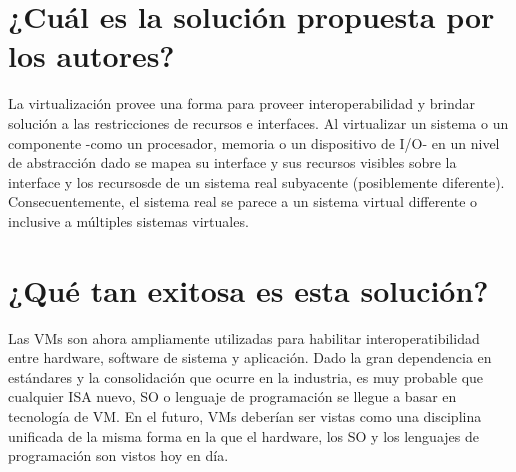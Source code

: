 \section{¿Cuál es la solución propuesta por los autores?}
La virtualización provee una forma para proveer interoperabilidad y brindar solución a las restricciones de recursos e interfaces. Al virtualizar un sistema o un componente -como un procesador, memoria o un dispositivo de I/O- en un nivel de abstracción dado se mapea su interface y sus recursos visibles sobre la interface y los recursosde de un sistema real subyacente (posiblemente diferente).  Consecuentemente, el sistema real se parece a un sistema virtual differente o inclusive a múltiples sistemas virtuales.


\section{¿Qué tan exitosa es esta solución?} 
Las VMs son ahora ampliamente utilizadas para habilitar interoperatibilidad entre hardware, software de sistema y aplicación. Dado la gran dependencia en estándares y la consolidación que ocurre en la industria, es muy probable que cualquier ISA nuevo, SO o lenguaje de programación se llegue a basar en tecnología de VM. En el futuro, VMs deberían ser vistas como una disciplina unificada de la misma forma en la que el hardware, los SO y los lenguajes de programación son vistos hoy en día.











